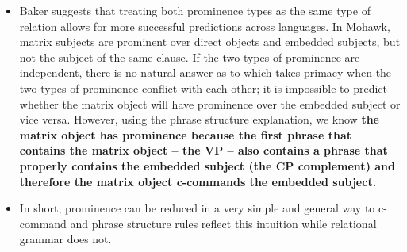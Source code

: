 \documentclass{article}
\begin{document}
\begin{itemize}
    \item Baker suggests that treating both prominence types as the same type of relation allows for more successful predictions across languages. In Mohawk, matrix subjects are prominent over direct objects and embedded subjects, but not the subject of the same clause. If the two types of prominence are independent, there is no natural answer as to which takes primacy when the two types of prominence conflict with each other; it is impossible to predict whether the matrix object will have prominence over the embedded subject or vice versa. However, using the phrase structure explanation, we know \textbf{the matrix object has prominence because the first phrase that contains the matrix object – the VP – also contains a phrase that properly contains the embedded subject (the CP complement) and therefore the matrix object c-commands the embedded subject.}
    \item In short, prominence can be reduced in a very simple and general way to c-command and phrase structure rules reflect this intuition while relational grammar does not.

\end{itemize}
\end{document}
